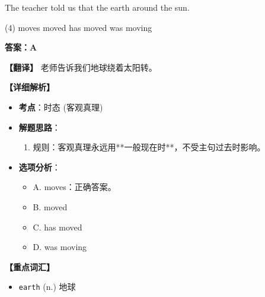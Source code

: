 \documentclass[11pt, a4paper]{article}
\newcommand{\analysis}[4]{
    \begin{solutionbox}
        \textbf{答案：#1}
        
        \textbf{【翻译】} #2
        
        \textbf{【详细解析】}
        #3
        
        \textbf{【重点词汇】}
        #4
    \end{solutionbox}
}
\newcommand{\blank}{\underline{\hspace{1.5cm}}}
\begin{document}
\begin{questions}
    \item The teacher told us that the earth \blank around the sun.
    \begin{tasks}(4)
        \task moves \task moved \task has moved \task was moving
    \end{tasks}
    \analysis{A}{老师告诉我们地球绕着太阳转。}{
        \begin{itemize}
            \item \textbf{考点}：时态 (客观真理)
            \item \textbf{解题思路}：
                \begin{enumerate}
                    \item 规则：客观真理永远用**一般现在时**，不受主句过去时影响。
                \end{enumerate}
            \item \textbf{选项分析}：
                \begin{itemize}
                    \item A. moves：正确答案。
                    \item B. moved
                    \item C. has moved
                    \item D. was moving
                \end{itemize}
        \end{itemize}
    }{
        \begin{itemize}
            \item \texttt{earth} (n.) 地球
        \end{itemize}
    }


\end{questions}
\end{document}

